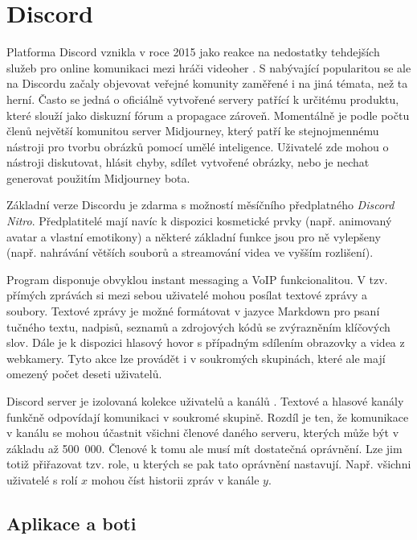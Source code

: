 \documentclass[FM]{tulthesis}
\begin{document}
	\section{Discord}
	
	Platforma Discord vznikla v roce 2015 jako reakce na nedostatky tehdejších služeb pro online komunikaci mezi hráči videoher \cite{lit_Discord}. S nabývající popularitou se ale na Discordu začaly objevovat veřejné komunity zaměřené i na jiná témata, než ta herní. Často se jedná o oficiálně vytvořené servery patřící k určitému produktu, které slouží jako diskuzní fórum a propagace zároveň. Momentálně je podle počtu členů největší komunitou server Midjourney, který patří ke stejnojmennému nástroji pro tvorbu obrázků pomocí umělé inteligence. Uživatelé zde mohou o nástroji diskutovat, hlásit chyby, sdílet vytvořené obrázky, nebo je nechat generovat použitím Midjourney bota.
	
	Základní verze Discordu je zdarma s možností měsíčního předplatného \textit{Discord Nitro}. Předplatitelé mají navíc k dispozici kosmetické prvky (např. animovaný avatar a vlastní emotikony) a některé základní funkce jsou pro ně vylepšeny (např. nahrávání větších souborů a streamování videa ve vyšším rozlišení).	

	Program disponuje obvyklou instant messaging a VoIP funkcionalitou. V tzv. přímých zprávách si mezi sebou uživatelé mohou posílat textové zprávy a soubory. Textové zprávy je možné formátovat v jazyce Markdown pro psaní tučného textu, nadpisů, seznamů a zdrojových kódů se zvýrazněním klíčových slov. Dále je k dispozici hlasový hovor s případným sdílením obrazovky a videa z webkamery. Tyto akce lze provádět i v soukromých skupinách, které ale mají omezený počet deseti uživatelů.
	
	Discord server je izolovaná kolekce uživatelů a kanálů \cite{doc_Discord}. Textové a hlasové kanály funkčně odpovídají komunikaci v soukromé skupině. Rozdíl je ten, že komunikace v kanálu se mohou účastnit všichni členové daného serveru, kterých může být v základu až 500~000. Členové k tomu ale musí mít dostatečná oprávnění. Lze jim totiž přiřazovat tzv. role, u kterých se pak tato oprávnění nastavují. Např. všichni uživatelé s rolí $x$ mohou číst historii zpráv v kanále $y$.
	
	\subsection{Aplikace a boti}
	
\end{document}
